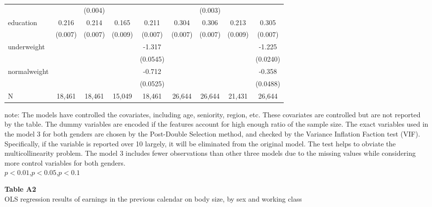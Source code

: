 \documentclass{article}
\begin{document}
\begin{center}
{{\begin{tabular}{lcccccccc}
& & (0.004) & &  && (0.003) && \\
education &0.216\textnormal{\superscript{***}} & 0.214\textnormal{\superscript{***}} & 0.165\textnormal{\superscript{***}} & 0.211\textnormal{\superscript{***}}& 0.304\textnormal{\superscript{***}} & 0.306\textnormal{\superscript{***}} & 0.213\textnormal{\superscript{***}} & 0.305\textnormal{\superscript{***}} \\
& (0.007)& (0.007) & (0.009) & (0.007)&(0.007) & (0.007) & (0.009) &(0.007)\\
underweight & & & & -1.317\textnormal{\superscript{**}} & & & & -1.225\textnormal{\superscript{***}} \\
& & & & (0.0545) & & & & (0.0240) \\
normalweight & & & & -0.712\textnormal{\superscript{***}} & & & & -0.358\textnormal{\superscript{***}} \\
& & & & (0.0525) & & & & (0.0488) \\
N & 18,461 & 18,461 & 15,049 & 18,461 & 26,644 & 26,644 & 21,431 & 26,644 \\
\end{tabular}}}
\end{center}
\vspace{-0.1cm}
\begin{footnotesize} note: The models have controlled the covariates, including age, seniority, region, etc. These covariates are controlled but are not reported by the table. The dummy variables are encoded if the features account for high enough ratio of the sample size. The exact variables used in the model 3 for both genders are chosen by the Post-Double Selection method, and checked by the Variance Inflation Faction test (VIF). Specifically, if the variable is reported over 10 largely, it will be eliminated from the original model. The test helps to obviate the multicollinearity problem. The model 3 includes fewer observations than other three models due to the missing values while considering more control variables for both genders. \\
\textnormal{\superscript{***}}$p<0.01$,\textnormal{\superscript{**}}$p<0.05$,\textnormal{\superscript{*}}$p<0.1$\normalsize
\end{footnotesize}


\newpage

\vspace{20pt}

\noindent
\textbf{Table A2} \\
OLS regression results of earnings in the previous calendar on body size, by sex and working class
\end{document}
